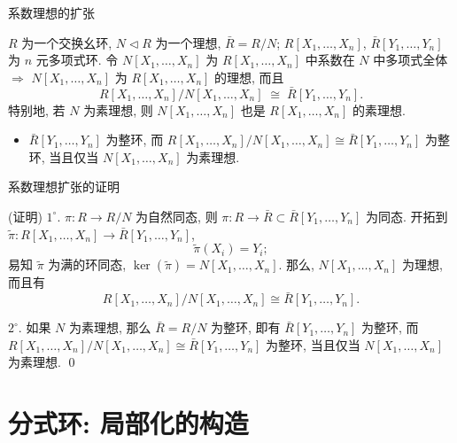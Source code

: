 
\begin{frame}{系数理想的扩张}

\begin{thm}[系数理想的扩张]
$R$ 为一个交换幺环, $N \lhd R$ 为一个理想, $\bar{R} = R/N$;
$R[X_1, \dots, X_n]$, $\bar{R}[Y_1, \dots, Y_n]$ 为 $n$ 元多项式环.
令 $N[X_1, \dots, X_n]$ 为 $R[X_1, \dots, X_n]$ 中系数在 $N$ 中多项式全体
$\Longrightarrow$ $N[X_1, \dots, X_n]$ 为 $R[X_1, \dots, X_n]$ 的理想, 而且
\[
R[X_1, \dots, X_n] \big/ N[X_1, \dots, X_n]
\;\cong\;
\bar{R}[Y_1, \dots, Y_n].
\]
特别地, 若 $N$ 为素理想, 则 $N[X_1, \dots, X_n]$ 也是
$R[X_1, \dots, X_n]$ 的素理想.
\end{thm}

\begin{itemize}
\item $\bar{R}[Y_1, \dots, Y_n]$ 为整环, 而
  $R[X_1, \dots, X_n] \big/ N[X_1, \dots, X_n] \cong \bar{R}[Y_1, \dots, Y_n]$
  为整环, 当且仅当 $N[X_1, \dots, X_n]$ 为素理想.
\end{itemize}

\end{frame}


\begin{frame}{系数理想扩张的证明}

\startproof[bg=yellow, fg=red](证明)
$1^{\circ}$. $\pi: R \to R/N$ 为自然同态, 则
$\pi: R \to \bar{R} \subset \bar{R}[Y_1, \dots, Y_n]$ 为同态.
开拓到 $\tilde{\pi}: R[X_1, \dots, X_n] \to \bar{R}[Y_1, \dots, Y_n]$,
\[
\tilde{\pi}(X_i) = Y_i ;
\]
易知 $\tilde{\pi}$ 为满的环同态, $\ker(\tilde{\pi}) = N[X_1, \dots, X_n]$.
那么, $N[X_1, \dots, X_n]$ 为理想, 而且有
\[
R[X_1, \dots, X_n] \big/ N[X_1, \dots, X_n]
\cong \bar{R}[Y_1, \dots, Y_n].
\]

\pause

$2^{\circ}$. 如果 $N$ 为素理想, 那么 $\bar{R} = R/N$ 为整环, 即有
$\bar{R}[Y_1, \dots, Y_n]$ 为整环, 而
$R[X_1, \dots, X_n] \big/ N[X_1, \dots, X_n] \cong \bar{R}[Y_1, \dots, Y_n]$
为整环, 当且仅当 $N[X_1, \dots, X_n]$ 为素理想.
\qed

\end{frame}


\section[分式环]{分式环: 局部化的构造}

